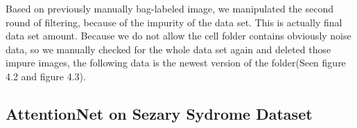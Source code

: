 Based on previously manually bag-labeled image, we manipulated the second round of filtering, because of the impurity of the data set. This is actually final data set amount. Because we do not allow the cell folder contains obviously noise data, so we manually checked for the whole data set again and deleted those impure images, the following data is the newest version of the folder(Seen figure 4.2 and figure 4.3). 



\subsection{AttentionNet on Sezary Sydrome Dataset}

\begin{table}[b]
\end{table}
